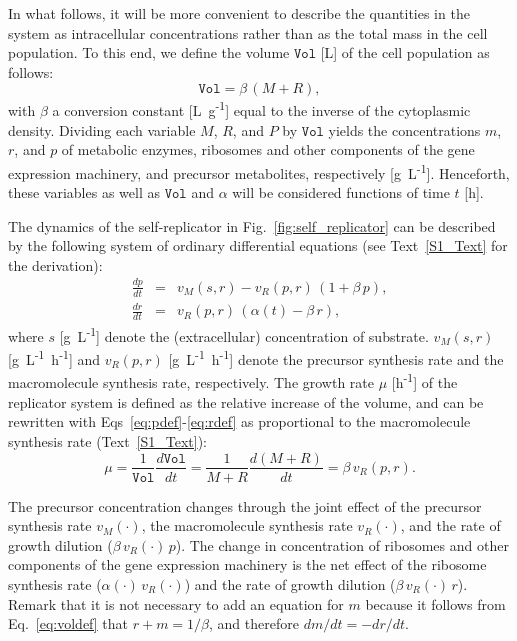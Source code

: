 In what follows, it will be more convenient to describe the quantities in the system as intracellular concentrations rather than as the total mass in the cell population.
To this end, we define the volume $\mathtt{Vol}$ [L] of the cell population as follows:
\begin{equation}
\mathtt{Vol} = \beta \, (M + R),
\label{eq:voldef}
\end{equation}
with $\beta$ a conversion constant [L~g\textsuperscript{-1}] equal to the inverse of the cytoplasmic density.
Dividing each variable $M$, $R$, and $P$ by $\mathtt{Vol}$ yields the concentrations $m$, $r$, and $p$ of metabolic enzymes, ribosomes and other components of the gene expression machinery, and precursor metabolites, respectively [g~L\textsuperscript{-1}].
Henceforth, these variables as well as $\mathtt{Vol}$ and $\alpha$ will be considered functions of time $t$ [h].

The dynamics of the self-replicator in Fig.~\ref{fig:self_replicator} can be described by the following system of ordinary differential equations (see Text~\ref{S1_Text} for the derivation):
\begin{eqnarray}
\frac{dp}{dt} &=& v_M(s,r) - v_R(p,r) \, (1+\beta\, p), \label{eq:pdef}\\
\frac{dr}{dt} &=& v_R(p,r) \, (\alpha(t) - \beta\, r), \label{eq:rdef}
\end{eqnarray}
where $s$ [g~L\textsuperscript{-1}] denote the (extracellular) concentration of substrate.
$v_M(s,r)$ [g~L\textsuperscript{-1}~h\textsuperscript{-1}] and $v_R(p,r)$ [g~L\textsuperscript{-1}~h\textsuperscript{-1}] denote the precursor synthesis rate and the macromolecule synthesis rate, respectively.
The growth rate $\mu$ [h\textsuperscript{-1}] of the replicator system is defined as the relative increase of the volume, and can be rewritten with Eqs~\ref{eq:pdef}-\ref{eq:rdef} as proportional to the macromolecule synthesis rate (Text~\ref{S1_Text}):
\begin{equation}\label{eq:growthrate}
\mu = \frac{1}{\mathtt{Vol}} \frac{d\mathtt{Vol}}{dt} = \frac{1}{M+R}\frac{d(M+R)}{dt} = \beta\, v_R(p,r).
\end{equation}

The precursor concentration changes through the joint effect of the precursor synthesis rate $v_M(\cdot )$, the macromolecule synthesis rate $v_R(\cdot )$, and the rate of growth dilution ($\beta\, v_R(\cdot ) \,p$).
The change in concentration of ribosomes and other components of the gene expression machinery is the net effect of the ribosome synthesis rate ($\alpha (\cdot )\, v_R (\cdot)$) and the rate of growth dilution ($\beta \, v_R(\cdot) \, r $).
Remark that it is not necessary to add an equation for $m$ because it follows from Eq.~\ref{eq:voldef} that $r + m = 1/\beta$, and therefore $dm/dt = - dr/dt$.

